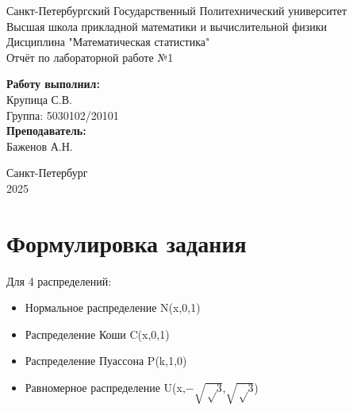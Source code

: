 \documentclass[12pt]{article}
\begin{document}
\begin{titlepage}	

	\begin{center}		

		Санкт-Петербургский Государственный Политехнический университет\\
		Высшая школа прикладной математики и вычислительной физики\\
		Дисциплина "Математическая статистика"\\[6cm]

		\huge {Отчёт по лабораторной работе №1} \\[6cm]


	\end{center} 
	\begin{flushright} 
		\begin{minipage}{0.3\textwidth} 
			\begin{flushleft} 

				\textbf{Работу выполнил:}\\
				{Крупица С.В.}\\
				{Группа:  5030102/20101} \\

				\textbf{Преподаватель:}\\
				{Баженов А.Н.}\\

			\end{flushleft}
		\end{minipage}
	\end{flushright}

	\vfill
	\begin{center}
		\large{Санкт-Петербург} \\
		\large{2025}
	\end{center}
\end{titlepage}

\newpage
\tableofcontents
\newpage
\section{Формулировка задания}
Для 4 распределений:
\begin{itemize}
    \item Нормальное распределение N(x,0,1)
    \item Распределение Коши C(x,0,1)
    \item Распределение Пуассона P(k,1,0)
    \item Равномерное распределение U(x,$-\sqrt{√3}$,$\sqrt{√3}$)
    
\end{itemize}
\end{document}
